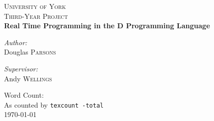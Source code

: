 \begin{titlepage}
\begin{center}


\textsc{\LARGE University of York}\\[1.5cm]

\textsc{\Large Third-Year Project}\\[0.5cm]

\HRule{\\[0.4cm]}
{\huge\bfseries{Real Time Programming in the D Programming Language}\\[0.4cm] }

\HRule{\\[1.5cm]}

\noindent
\begin{minipage}[t]{0.4\textwidth}
\begin{flushleft} \large
\emph{Author:}\\
Douglas \textsc{Parsons}
\end{flushleft}
\end{minipage}
\begin{minipage}[t]{0.4\textwidth}
\begin{flushright} \large
\emph{Supervisor:} \\
Andy \textsc{Wellings}
\end{flushright}
\end{minipage}

\vfill
 
{\small Word Count: \wordcount \\}
\vspace{5mm}
{\small As counted by \texttt{texcount -total} \\}
\vspace{15mm}
{\large \today}

\end{center}
\end{titlepage}

